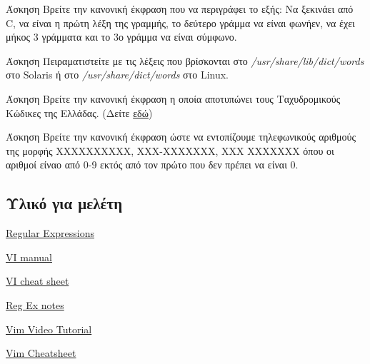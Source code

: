\begin{exercisebox}{  Άσκηση}
Βρείτε την κανονική έκφραση που να περιγράφει το εξής: Να ξεκινάει από C, να είναι η πρώτη λέξη της γραμμής, το δεύτερο γράμμα να είναι φωνήεν, να έχει μήκος 3 γράμματα και το 3ο γράμμα να είναι σύμφωνο.
\end{exercisebox}




\begin{exercisebox}{ Άσκηση}
Πειραματιστείτε με τις λέξεις που βρίσκονται στο \emph{/usr/share/lib/dict/words} στο Solaris ή στο \emph{/usr/share/dict/words} στο Linux.
\end{exercisebox}



\begin{exercisebox}{ Άσκηση}
Βρείτε την κανονική έκφραση η οποία αποτυπώνει τους Ταχυδρομικούς Κώδικες της Ελλάδας. (Δείτε \href{http://goo.gl/TRZqdu}{εδώ})
\end{exercisebox}


\begin{exercisebox}{ Άσκηση}
Βρείτε την κανονική έκφραση ώστε να εντοπίζουμε τηλεφωνικούς αριθμούς της μορφής ΧΧΧΧΧΧΧΧΧΧ, ΧΧΧ-ΧΧΧΧΧΧΧ, ΧΧΧ ΧΧΧΧΧΧΧ όπου οι αριθμοί είναο από 0-9 εκτός από τον πρώτο που δεν πρέπει να είναι 0.
\end{exercisebox}

\subsection{Υλικό για μελέτη}
\begin{packed_item}
	\item \href{http://www.grymoire.com/Unix/Regular.html}{Regular Expressions}
	\item \href{http://www.netads.com/~meo/useful/vi/vi.rm.html}{VI manual}
	\item \href{http://ryanstutorials.net/linuxtutorial/cheatsheetvi.php}{VI cheat sheet}
	\item \href{https://cs.lmu.edu/~ray/notes/regex/}{Reg Ex notes}
	\item \href{https://www.youtube.com/watch?v=yVTc_EuL3vo&list=PLXVWHDFdFYFgKPEMLVOsYy77WQ2unHeo2&index=2&t=4421s}{Vim Video Tutorial}
	\item \href{https://github.com/nilp0inter/Vim-for-Muggles/blob/master/cheatsheet.pdf}{Vim Cheatsheet}
\end{packed_item}



